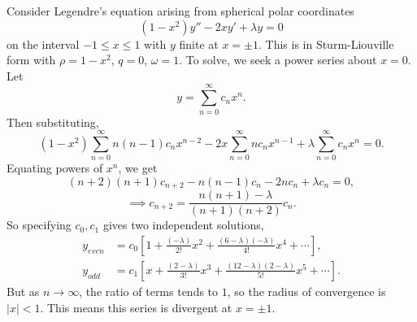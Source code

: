 \documentclass[12pt]{article}
\theoremstyle{definition}
\theoremstyle{remark}
\begin{document}
Consider Legendre's equation arising from spherical polar coordinates
\[
	(1 - x^2)y'' - 2xy' + \lambda y = 0
\]
on the interval $-1 \leq x \leq 1$ with $y$ finite at $x = \pm 1$. This is in Sturm-Liouville form with $\rho = 1-x^2$, $q = 0$, $\omega = 1$. To solve, we seek a power series about $x = 0$. Let
\[
y = \sum_{n = 0}^{\infty} c_n x^{n}
.\]
Then substituting,
\[
	(1 - x^2)\sum_{n = 0}^{\infty} n(n-1) c_n x^{n-2} - 2x \sum_{n = 0}^{\infty} n c_n x^{n-1} + \lambda \sum_{n = 0}^{\infty} c_n x^{n} = 0
.\]
Equating powers of $x^{n}$, we get
\[
	(n+2)(n+1)c_{n+2} - n(n-1)c_n - 2n c_n + \lambda c_n = 0
,\]
\[
	\implies c_{n+2} = \frac{n(n+1) - \lambda}{(n+1)(n+2)} c_n
.\]
So specifying $c_0, c_1$ gives two independent solutions,
\begin{align*}
	y_{even} &= c_0 \left[ 1 + \frac{(-\lambda)}{2!}x^2 + \frac{(6 - \lambda)(-\lambda)}{4!}x^{4} + \cdots \right], \\
	y_{odd} &= c_1 \left[x + \frac{(2 - \lambda)}{3!}x^3 + \frac{(12 - \lambda)(2 - \lambda)}{5!}x^{5} + \cdots \right].
\end{align*}
But as $n \to \infty$, the ratio of terms tends to $1$, so the radius of convergence is $|x| < 1$. This means this series is divergent at $x = \pm 1$.
\newpage

\printindex
\end{document}
